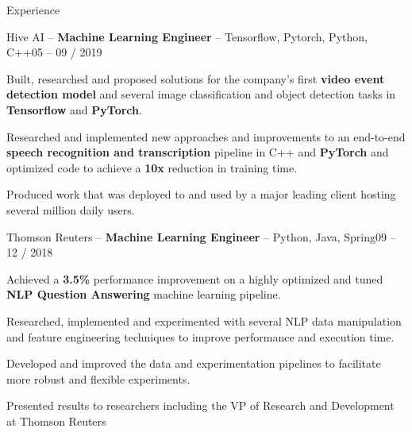 \documentclass{resume} %
\begin{document}
\begin{rSection}{Experience}


		\begin{rSubsection}{\large Hive AI \small  -- \textbf{Machine Learning Engineer} -- \normalfont Tensorflow, Pytorch, Python, C++}{05 -- 09 / 2019}{}{}
		\item Built, researched and proposed solutions for the company's first \textbf{video event detection model} and several image classification and object detection tasks in \textbf{Tensorflow} and \textbf{PyTorch}.
		\item Researched and implemented new approaches and improvements to an end-to-end \textbf{speech recognition and transcription} pipeline in C++ and \textbf{PyTorch} and optimized code to achieve a \textbf{10x} reduction in training time.
				\item Produced work that was deployed to and used by a major leading client hosting several million daily users.
\end{rSubsection}





\begin{rSubsection}{\large Thomson Reuters -- \small \textbf{Machine Learning Engineer} \normalfont -- Python, Java, Spring}{09 -- 12 / 2018}{}{}
\item Achieved a \textbf{3.5\%} performance improvement on a highly optimized and tuned \textbf{NLP Question Answering} machine learning pipeline.

\item Researched, implemented and experimented with several NLP data manipulation and feature engineering techniques to improve performance and execution time.
\item Developed and improved the data and experimentation pipelines to facilitate more robust and flexible experiments.

\item Presented results to researchers including the 
VP of Research and Development at Thomson Reuters
\end{rSubsection}


\end{rSection}
\end{document}
